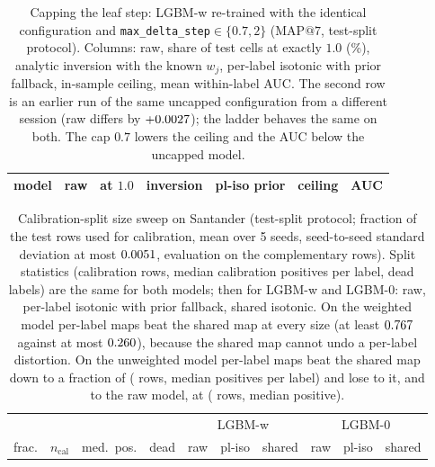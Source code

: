 \documentclass[sigconf,nonacm]{acmart}
\makeatletter
\newcommand{\Sm}{\textsf{LGBM-w}\xspace}
\newcommand{\Nm}{\textsf{LGBM-0}\xspace}
\newcommand{\mapseven}{\mathrm{MAP}@7\xspace}
\makeatother
\begin{document}
\begin{table}[H]
\caption{Capping the leaf step: \Sm re-trained with the identical configuration and \texttt{max\_delta\_step}$\in\{0.7,2\}$ ($\mapseven$, test-split protocol). Columns: raw, share of test cells at exactly $1.0$ (\%), analytic inversion with the known $w_j$, per-label isotonic with prior fallback, in-sample ceiling, mean within-label AUC. The second row is an earlier run of the same uncapped configuration from a different session (raw differs by $+0.0027$); the ladder behaves the same on both. The cap $0.7$ lowers the ceiling and the AUC below the uncapped model.}
\label{tab:mds}
\footnotesize
\setlength{\tabcolsep}{3pt}
\begin{tabular}{@{}lcccccc@{}}
\toprule
model & raw & at $1.0$ & inversion & pl-iso prior & ceiling & AUC \\
\midrule

\bottomrule
\end{tabular}
\end{table}
\begin{table}[H]
\caption{Calibration-split size sweep on Santander (test-split protocol; fraction of the test rows used for calibration, mean over 5 seeds, seed-to-seed standard deviation at most $0.0051$, evaluation on the complementary rows). Split statistics (calibration rows, median calibration positives per label, dead labels) are the same for both models; then for \Sm and \Nm: raw, per-label isotonic with prior fallback, shared isotonic. On the weighted model per-label maps beat the shared map at every size (at least $0.767$ against at most $0.260$), because the shared map cannot undo a per-label distortion. On the unweighted model per-label maps beat the shared map down to a fraction of \ncalsizeSmallestFracPlWins{} (\ncalsizeSmallestNcalPlWins{} rows, median \ncalsizeSmallestMedPlWins{} positives per label) and lose to it, and to the raw model, at \ncalsizeLoseFrac{} (\ncalsizeLoseNcal{} rows, median \ncalsizeLoseMed{} positive).}
\label{tab:calsize}
\footnotesize
\setlength{\tabcolsep}{2.5pt}
\begin{tabular}{@{}lrrr|ccc|ccc@{}}
\toprule
 & & & & \multicolumn{3}{c|}{\Sm} & \multicolumn{3}{c}{\Nm} \\
frac. & $n_{\mathrm{cal}}$ & med.\ pos. & dead & raw & pl-iso & shared & raw & pl-iso & shared \\
\midrule

\bottomrule
\end{tabular}
\end{table}
\end{document}
